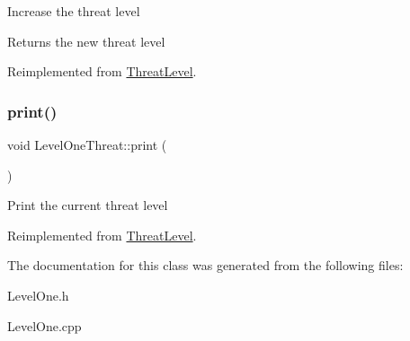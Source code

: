 Increase the threat level \begin{DoxyReturn}{Returns}
the new threat level 
\end{DoxyReturn}


Reimplemented from \hyperlink{classThreatLevel_ae18f6ebe2186ae1b61d4817196f969e3}{Threat\+Level}.

\mbox{\label{classLevelOneThreat_a902492d8341a398b0209fb89e2aca68e}} 
\subsubsection{\texorpdfstring{print()}{print()}}
{\footnotesize\ttfamily void Level\+One\+Threat\+::print (\begin{DoxyParamCaption}{ }\end{DoxyParamCaption})\hspace{0.3cm}{\ttfamily [virtual]}}

Print the current threat level 

Reimplemented from \hyperlink{classThreatLevel_a5bdff5eeffed8db616ca06091097c138}{Threat\+Level}.



The documentation for this class was generated from the following files\+:\begin{DoxyCompactItemize}
\item 
Level\+One.\+h\item 
Level\+One.\+cpp\end{DoxyCompactItemize}
